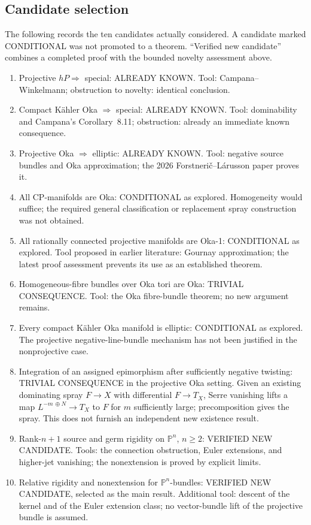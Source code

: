 \documentclass[12pt]{amsart}
\theoremstyle{definition}
\theoremstyle{remark}
\numberwithin{equation}{section}
\newcommand{\mP}{\mathbb{P}}
\begin{document}
\subsection{Candidate selection}
The following records the ten candidates actually considered. A candidate marked CONDITIONAL was not promoted to a theorem. ``Verified new candidate'' combines a completed proof with the bounded novelty assessment above.
\begin{enumerate}
\item Projective $hP\Rightarrow$ special: ALREADY KNOWN. Tool: Campana--Winkelmann; obstruction to novelty: identical conclusion.
\item Compact K\"ahler Oka $\Rightarrow$ special: ALREADY KNOWN. Tool: dominability and Campana's Corollary~8.11; obstruction: already an immediate known consequence.
\item Projective Oka $\Rightarrow$ elliptic: ALREADY KNOWN. Tool: negative source bundles and Oka approximation; the 2026 Forstneri\v c--L\'arusson paper proves it.
\item All CP-manifolds are Oka: CONDITIONAL as explored. Homogeneity would suffice; the required general classification or replacement spray construction was not obtained.
\item All rationally connected projective manifolds are Oka-1: CONDITIONAL as explored. Tool proposed in earlier literature: Gournay approximation; the latest proof assessment prevents its use as an established theorem.
\item Homogeneous-fibre bundles over Oka tori are Oka: TRIVIAL CONSEQUENCE. Tool: the Oka fibre-bundle theorem; no new argument remains.
\item Every compact K\"ahler Oka manifold is elliptic: CONDITIONAL as explored. The projective negative-line-bundle mechanism has not been justified in the nonprojective case.
\item Integration of an assigned epimorphism after sufficiently negative twisting: TRIVIAL CONSEQUENCE in the projective Oka setting. Given an existing dominating spray $F\to X$ with differential $F\to T_X$, Serre vanishing lifts a map $L^{-m\,\oplus N}\to T_X$ to $F$ for $m$ sufficiently large; precomposition gives the spray. This does not furnish an independent new existence result.
\item Rank-$n+1$ source and germ rigidity on $\mP^n$, $n\geq2$: VERIFIED NEW CANDIDATE. Tools: the connection obstruction, Euler extensions, and higher-jet vanishing; the nonextension is proved by explicit limits.
\item Relative rigidity and nonextension for $\mP^n$-bundles: VERIFIED NEW CANDIDATE, selected as the main result. Additional tool: descent of the kernel and of the Euler extension class; no vector-bundle lift of the projective bundle is assumed.
\end{enumerate}
\end{document}
